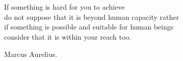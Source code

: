 
\thispagestyle{empty}
\vspace{1cm}




\cleardoublepage %
\chapter*{}
\setlength{\leftmargin}{0.5\textwidth}
\setlength{\parsep}{0cm}
\addtolength{\topsep}{0.5cm}
\begin{flushright}
	\small\em{
		If something is hard for you to achieve \\
		do not suppose that it is beyond human capacity rather\\ 
		if something is possible and suitable for human beings \\
		consider that it is within your reach too.
		
	}
\end{flushright}
\begin{flushright}
	\small{
		Marcus Aurelius.
	}
\end{flushright}
\cleardoublepage %